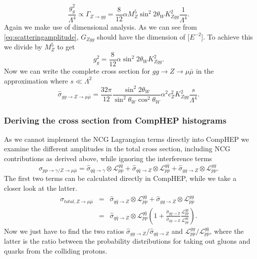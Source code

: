 \begin{equation}
	\frac{g_g^2}{\Lambda^4} \propto \Gamma_{Z \rightarrow gg} = \frac{8}{12} \alpha M_Z^5 \sin^2{2\theta_W} K_{Zgg}^2 \frac{1}{\Lambda^4}.
\end{equation}
Again we make use of dimensional analysis. As we can see from \eqref{eq:scatteringamplitude}, $G_{Zgg}$ should have the dimension of [$E^{-2}$]. To achieve this we divide by $M_Z^5$ to get
\begin{equation}
	g_g^2 = \frac{8}{12} \alpha \sin^2{2\theta_W} K_{Zgg}^2.
\end{equation}
Now we can write the complete cross section for $gg \rightarrow Z \rightarrow \mu \bar \mu$ in the approximation where $s \ll \Lambda^2$
\begin{equation} \label{eq:sigmahatgg}
	\hat \sigma_{gg \rightarrow Z \rightarrow \mu \bar \mu} = \frac{32\pi}{12} \frac{\sin^2{2\theta_W}}{\sin^2{\theta_W}\cos^2{\theta_W}} \alpha^2 c_Z^2 K_{Zgg}^2 \frac{s}{\Lambda^4}.
\end{equation}

\subsubsection{Deriving the cross section from CompHEP histograms}
As we cannot implement the NCG Lagrangian terms directly into CompHEP we examine the different amplitudes in the total cross section, including NCG contributions as derived above, while ignoring the interference terms
\begin{equation}
	\sigma_{pp \rightarrow \gamma/ Z \rightarrow \mu \bar \mu} = \hat \sigma_{q \bar q \rightarrow \gamma} \otimes \mathcal{L}_{pp}^{q \bar q}+ \hat \sigma_{q \bar q \rightarrow Z} \otimes \mathcal{L}_{pp}^{q \bar q}+ \hat \sigma_{gg \rightarrow Z} \otimes \mathcal{L}_{pp}^{gg}.
\end{equation}
The first two terms can be calculated directly in CompHEP, while we take a closer look at the latter. 
\begin{eqnarray} \label{eq:qqggztotal}
	\sigma_{total, Z \rightarrow \mu \bar \mu} &=& \hat \sigma_{q \bar q \rightarrow Z} \otimes \mathcal{L}_{pp}^{q \bar q}+ \hat \sigma_{gg \rightarrow Z} \otimes \mathcal{L}_{pp}^{gg} \nonumber \\
	&=&\hat \sigma_{q \bar q \rightarrow Z} \otimes \mathcal{L}_{pp}^{q \bar q} \left (1+ \frac{\hat \sigma_{gg \rightarrow Z}}{\hat \sigma_{q \bar q \rightarrow Z}} \frac{\mathcal{L}_{pp}^{gg}} {\mathcal{L}_{pp}^{q \bar q}} \right ).
\end{eqnarray}
Now we just have to find the two ratios ${\hat \sigma_{gg \rightarrow Z}}/{\hat \sigma_{q \bar q \rightarrow Z}}$ and ${\mathcal{L}_{pp}^{gg}}/{\mathcal{L}_{pp}^{q \bar q}}$, where the latter is the ratio between the probability distributions for taking out gluons and quarks from the colliding protons.

